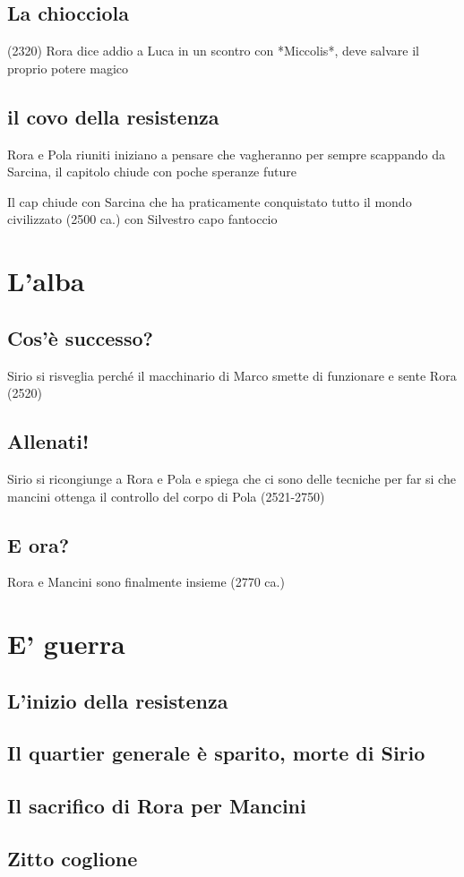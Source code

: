 \documentclass{book}
\begin{document}
\section{La chiocciola}
(2320) Rora dice addio a Luca in un scontro con *Miccolis*, deve salvare il proprio potere magico

\section{il covo della resistenza}
Rora e Pola riuniti iniziano a pensare che vagheranno per sempre scappando da Sarcina, il capitolo chiude con poche speranze future

Il cap chiude con Sarcina che ha praticamente conquistato tutto il mondo civilizzato (2500 ca.) con Silvestro capo fantoccio

\chapter{L'alba}
\section{Cos'è successo?}
Sirio si risveglia perché il macchinario di Marco smette di funzionare e sente Rora (2520)

\section{Allenati!}
Sirio si ricongiunge a Rora e Pola e spiega che ci sono delle tecniche per far si che mancini ottenga il controllo del corpo di Pola
(2521-2750)
\section{E ora?}
Rora e Mancini sono finalmente insieme (2770 ca.) 

\chapter{E' guerra}
\section{L'inizio della resistenza}
\section{Il quartier generale è sparito, morte di Sirio}
\section{Il sacrifico di Rora per Mancini}
\section{Zitto coglione}
\end{document}
